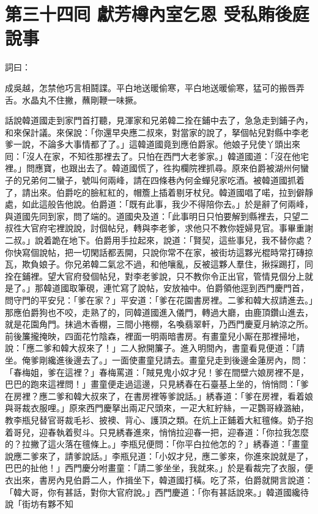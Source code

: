 
\chapter*{第三十四囘 獻芳樽內室乞恩 受私賄後庭說事}


詞曰：

\begin{myquote} 
成吳越，怎禁他巧言相鬪諜。平白地送暖偷寒，平白地送暖偷寒，猛可的搬唇弄舌。水晶丸不住撇，蘸剛鞭一味撅。

\end{myquote} 

話說韓道國走到家門首打聽，見渾家和兄弟韓二拴在鋪中去了，急急走到鋪子內，和來保計議。來保說：「你還早央應二叔來，對當家的說了，拏個帖兒對縣中李老爹一說，不論多大事情都了了。」這韓道國竟到應伯爵家。他娘子兒使丫頭出來囘：「沒人在家，不知徃那裡去了。只怕在西門大老爹家。」韓道國道：「沒在他宅裡。」問應寶，也跟出去了。韓道國慌了，徃抅欄院裡抓尋。原來伯爵被湖州何蠻子的兄弟何二蠻子，號叫何兩峰，請在四條巷內何金蟬兒家吃酒。被韓道國抓着了，請出來。伯爵吃的臉紅紅的，帽簷上插着剔牙杖兒。韓道國唱了喏，拉到僻靜處，如此這般告他說。伯爵道：「既有此事，我少不得陪你去。」於是辭了何兩峰，與道國先同到家，問了端的。道國央及道：「此事明日只怕要解到縣裡去，只望二叔徃大官府宅裡說說，討個帖兒，轉與李老爹，求他只不教你姪婦見官。事畢重謝二叔。」說着跪在地下。伯爵用手拉起來，說道：「賢契，這些事兒，我不替你處？你快寫個說帖，把一切閑話都丟開，只說你常不在家，被街坊這夥光棍時常打磚掠瓦，欺負娘子。你兄弟韓二氣忿不過，和他嚷亂，反被這夥人羣住，揪採踢打，同拴在鋪裡。望大官府發個帖兒，對李老爹說，只不教你令正出官，管情見個分上就是了。」那韓道國取筆硯，連忙寫了說帖，安放袖中。伯爵領他逕到西門慶門首，問守門的平安兒：「爹在家？」平安道：「爹在花園書房裡。二爹和韓大叔請進去。」那應伯爵狗也不咬，走熟了的，同韓道國進入儀門，轉過大廳，由鹿頂鑽山進去，就是花園角門。抹過木香棚，三間小捲棚，名喚翡翠軒，乃西門慶夏月納涼之所。前後簾攏掩映，四面花竹陰森，裡面一明兩暗書房。有畫童兒小厮在那裡掃地，說：「應二爹和韓大叔來了！」二人掀開簾子。進入明間內，書童看見便道：「請坐。俺爹剛纔進後邊去了。」一面使畫童兒請去。畫童兒走到後邊金蓮房內，問：「春梅姐，爹在這裡？」春梅罵道：「賊見鬼小奴才兒！爹在間壁六娘房裡不是，巴巴的跑來這裡問！」畫童便走過這邊，只見綉春在石臺基上坐的，悄悄問：「爹在房裡？應二爹和韓大叔來了，在書房裡等爹說話。」綉春道：「爹在房裡，看着娘與哥裁衣服哩。」原來西門慶拏出兩疋尺頭來，一疋大紅紵絲，一疋鸚哥綠潞紬，教李瓶兒替官哥裁毛衫、披襖、背心、護頂之類。在炕上正鋪着大紅氊條。奶子抱着哥兒，迎春執着熨斗。只見綉春進來，悄悄拉迎春一把，迎春道：「你拉我怎麼的？拉撇了這火落在氊條上。」{}李瓶兒便問：「你平白拉他怎的？」綉春道：「畫童說應二爹來了，請爹說話。」李瓶兒道：「小奴才兒，應二爹來，你進來說就是了，巴巴的扯他！」西門慶分咐畫童：「請二爹坐坐，我就來。」於是看裁完了衣服，便衣出來，書房內見伯爵二人，作揖坐下，韓道國打橫。吃了茶，伯爵就開言說道：「韓大哥，你有甚話，對你大官府說。」西門慶道：「你有甚話說來。」韓道國纔待說「街坊有夥不知